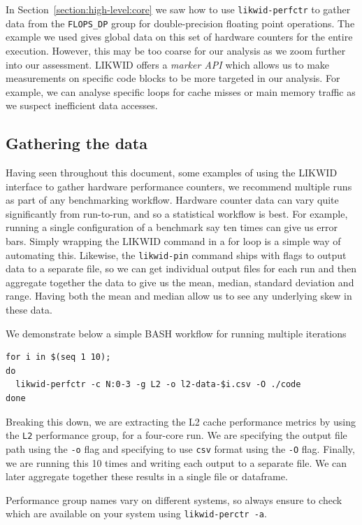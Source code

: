 In Section~\ref{section:high-level:core} we saw how to use
\texttt{likwid-perfctr} to gather data from the \texttt{FLOPS\_DP} group for
double-precision floating point operations. The example we used gives global
data on this set of hardware counters for the entire execution. However, this
may be too coarse for our analysis as we zoom further into our assessment.
LIKWID offers a \emph{marker API} which allows us to make measurements on
specific code blocks to be more targeted in our analysis. For example, we can
analyse specific loops for cache misses or main memory traffic as we suspect
inefficient data accesses.

\subsection{Gathering the data}

Having seen throughout this document, some examples of using the LIKWID
interface to gather hardware performance counters, we recommend multiple runs
as part of any benchmarking workflow. Hardware counter data can vary quite
significantly from run-to-run, and so a statistical workflow is best. For
example, running a single configuration of a benchmark say ten times can give
us error bars. Simply wrapping the LIKWID command in a for loop is a simple way
of automating this. Likewise, the \texttt{likwid-pin} command ships with flags
to output data to a separate file, so we can get individual output files for
each run and then aggregate together the data to give us the mean, median,
standard deviation and range. Having both the mean and median allow us to see
any underlying skew in these data.

\begin{instructions}{\likwid}

We demonstrate below a simple BASH workflow for running multiple iterations

\begin{verbatim}
for i in $(seq 1 10);
do
  likwid-perfctr -c N:0-3 -g L2 -o l2-data-$i.csv -O ./code
done
\end{verbatim}
Breaking this down, we are extracting the L2 cache performance metrics by using the \texttt{L2} performance group, for a four-core run. We are specifying the output file path using the \texttt{-o} flag and specifying to use \texttt{csv} format using the \texttt{-O} flag. Finally, we are running this 10 times and writing each output to a separate file. We can later aggregate together these results in a single file or dataframe.

Performance group names vary on different systems, so always ensure to check which are available on your system using \texttt{likwid-perctr -a}.
\end{instructions}


